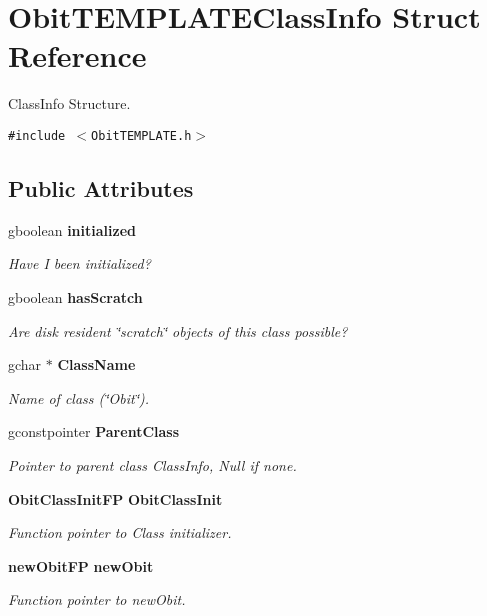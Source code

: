 \section{Obit\-TEMPLATEClass\-Info Struct Reference}
\label{structObitTEMPLATEClassInfo}
Class\-Info Structure.  


{\tt \#include $<$Obit\-TEMPLATE.h$>$}

\subsection*{Public Attributes}
\begin{CompactItemize}
\item 
gboolean {\bf initialized}
\begin{CompactList}\small\item\em Have I been initialized? \item\end{CompactList}\item 
gboolean {\bf has\-Scratch}
\begin{CompactList}\small\item\em Are disk resident \char`\"{}scratch\char`\"{} objects of this class possible? \item\end{CompactList}\item 
gchar $\ast$ {\bf Class\-Name}
\begin{CompactList}\small\item\em Name of class (\char`\"{}Obit\char`\"{}). \item\end{CompactList}\item 
gconstpointer {\bf Parent\-Class}
\begin{CompactList}\small\item\em Pointer to parent class Class\-Info, Null if none. \item\end{CompactList}\item 
{\bf Obit\-Class\-Init\-FP} {\bf Obit\-Class\-Init}
\begin{CompactList}\small\item\em Function pointer to Class initializer. \item\end{CompactList}\item 
{\bf new\-Obit\-FP} {\bf new\-Obit}
\begin{CompactList}\small\item\em Function pointer to new\-Obit. \item\end{CompactList}\item 

\end{CompactItemize}
